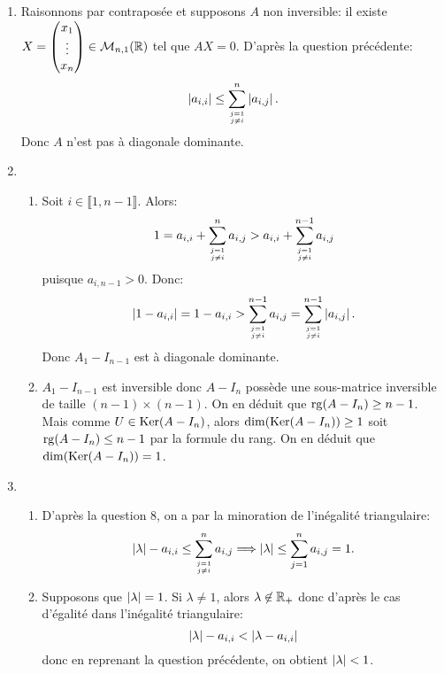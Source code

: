 \begin{enumerate}
      
 
 
 
 
 \item Raisonnons par contraposée et supposons $A$ non inversible: il existe $X = \begin{pmatrix}
                                                         x_{1}\\
                                                         \vdots \\
                                                         x_{n}
                                                        \end{pmatrix}\in \mathcal{M}_{n,1}(\mathbb{R})$ tel que $AX = 0$. D'après la question précédente:
    \[ \abs{a_{i,i}}\leq \sum_{\empil{j=1}{j\neq i}}^{n}\abs{a_{i,j}}.\]
    Donc $A$ n'est pas à diagonale dominante.
 
 
 
 
 
 
 \item \begin{enumerate}
            \item Soit $i\in \llbracket 1, n-1\rrbracket$. Alors:
            \[ 1 = a_{i,i} + \sum_{\empil{j=1}{j\neq i}}^{n} a_{i,j} > a_{i,i} + \sum_{\empil{j=1}{j\neq i}}^{n-1}a_{i,j}\]
            puisque $a_{i,n-1}>0$. Donc:
            \[ \abs{1-a_{i,i}} = 1-a_{i,i} > \sum_{\empil{j=1}{j\neq i}}^{n-1}a_{i,j} = \sum_{\empil{j=1}{j\neq i}}^{n-1}\abs{a_{i,j}}.\]
            Donc $A_{1}-I_{n-1}$ est à diagonale dominante.
            \item $A_{1}-I_{n-1}$ est inversible donc $A-I_{n}$ possède une sous-matrice inversible de taille $(n-1)\times (n-1)$. On en déduit que $\operatorname{rg}(A-I_{n})\geq n-1$. Mais comme $U\in \operatorname{Ker}(A-I_{n})$, alors
            $\dim(\operatorname{Ker}(A-I_{n}))\geq 1$ soit $\operatorname{rg}(A-I_{n})\leq n-1$ par la formule du rang. On en déduit que $\dim(\operatorname{Ker}(A-I_{n})) = 1$. 
           \end{enumerate}
           
           
 
 
 
 
 
 \item \begin{enumerate}
            \item D'après la question 8, on a par la minoration de l'inégalité triangulaire:
            \[ \abs{\lambda}-a_{i,i} \leq \sum_{\empil{j=1}{j\neq i}}^{n}a_{i,j} \Longrightarrow \abs{\lambda}\leq \sum_{j=1}^{n}a_{i,j} = 1.\]
            \item Supposons que $\left\vert\lambda\right\vert = 1$. Si $\lambda \neq 1$, alors $\lambda \not \in \mathbb{R}_{+}$ donc d'après le cas d'égalité dans l'inégalité triangulaire:
            \[ \left\vert\lambda\right\vert-a_{i,i} < \left\vert\lambda - a_{i,i}\right\vert\]
            donc en reprenant la question précédente, on obtient $\left\vert\lambda\right\vert < 1$. 
           \end{enumerate}



\end{enumerate}
